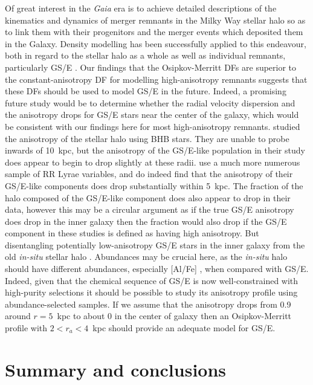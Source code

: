 Of great interest in the \textit{Gaia} era is to achieve detailed descriptions of the kinematics and dynamics of merger remnants in the Milky Way stellar halo so as to link them with their progenitors and the merger events which deposited them in the Galaxy. Density modelling has been successfully applied to this endeavour, both in regard to the stellar halo as a whole \parencite[e.g. ][]{deason19,mackereth20} as well as individual remnants, particularly GS/E \parencite[e.g. ][]{han22,lane23}. Our findings that the Osipkov-Merritt DFs are superior to the constant-anisotropy DF for modelling high-anisotropy remnants suggests that these DFs should be used to model GS/E in the future. Indeed, a promising future study would be to determine whether the radial velocity dispersion and the anisotropy drops for GS/E stars near the center of the galaxy, which would be consistent with our findings here for most high-anisotropy remnants. \textcite{lancaster19} studied the anisotropy of the stellar halo using BHB stars. They are unable to probe inwards of 10~kpc, but the anisotropy of the GS/E-like population in their study does appear to begin to drop slightly at these radii. \textcite{iorio21} use a much more numerous sample of RR Lyrae variables, and do indeed find that the anisotropy of their GS/E-like components does drop substantially within 5~kpc. The fraction of the halo composed of the GS/E-like component does also appear to drop in their data, however this may be a circular argument as if the true GS/E anisotropy does drop in the inner galaxy then the fraction would also drop if the GS/E component in these studies is defined as having high anisotropy. But disentangling potentially low-anisotropy GS/E stars in the inner galaxy from the old \textit{in-situ} stellar halo \parencite[e.g.][]{belokurov22,rix22}. Abundances may be crucial here, as the \textit{in-situ} halo should have different abundances, especially [Al/Fe] \parencite[see][]{belokurov22}, when compared with GS/E. Indeed, given that the chemical sequence of GS/E is now well-constrained with high-purity selections \parencite[e.g.][]{lane23} it should be possible to study its anisotropy profile using abundance-selected samples. If we assume that the anisotropy drops from 0.9 around $r=5$~kpc to about 0 in the center of galaxy then an Osipkov-Merritt profile with $2 < r_{a} < 4$~kpc should provide an adequate model for GS/E. 

\section{Summary and conclusions}
\label{ch4:sec:summary-conclusions}

